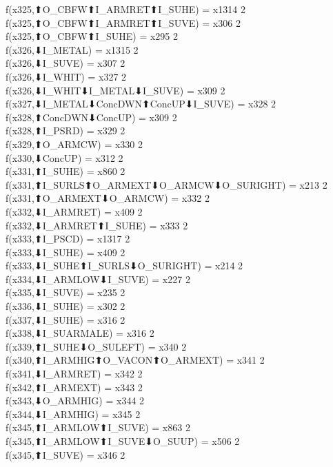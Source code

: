 f(x325,⬆O_CBFW⬆I_ARMRET⬆I_SUHE) = x1314 {2} \\
f(x325,⬆O_CBFW⬆I_ARMRET⬆I_SUVE) = x306 {2} \\
f(x325,⬆O_CBFW⬆I_SUHE) = x295 {2} \\
f(x326,⬇I_METAL) = x1315 {2} \\
f(x326,⬇I_SUVE) = x307 {2} \\
f(x326,⬇I_WHIT) = x327 {2} \\
f(x326,⬇I_WHIT⬇I_METAL⬇I_SUVE) = x309 {2} \\
f(x327,⬇I_METAL⬇ConcDWN⬆ConcUP⬇I_SUVE) = x328 {2} \\
f(x328,⬆ConcDWN⬇ConcUP) = x309 {2} \\
f(x328,⬆I_PSRD) = x329 {2} \\
f(x329,⬆O_ARMCW) = x330 {2} \\
f(x330,⬇ConcUP) = x312 {2} \\
f(x331,⬆I_SUHE) = x860 {2} \\
f(x331,⬆I_SURLS⬆O_ARMEXT⬇O_ARMCW⬇O_SURIGHT) = x213 {2} \\
f(x331,⬆O_ARMEXT⬇O_ARMCW) = x332 {2} \\
f(x332,⬇I_ARMRET) = x409 {2} \\
f(x332,⬇I_ARMRET⬆I_SUHE) = x333 {2} \\
f(x333,⬆I_PSCD) = x1317 {2} \\
f(x333,⬇I_SUHE) = x409 {2} \\
f(x333,⬇I_SUHE⬆I_SURLS⬇O_SURIGHT) = x214 {2} \\
f(x334,⬇I_ARMLOW⬇I_SUVE) = x227 {2} \\
f(x335,⬇I_SUVE) = x235 {2} \\
f(x336,⬇I_SUHE) = x302 {2} \\
f(x337,⬇I_SUHE) = x316 {2} \\
f(x338,⬇I_SUARMALE) = x316 {2} \\
f(x339,⬆I_SUHE⬇O_SULEFT) = x340 {2} \\
f(x340,⬆I_ARMHIG⬆O_VACON⬆O_ARMEXT) = x341 {2} \\
f(x341,⬇I_ARMRET) = x342 {2} \\
f(x342,⬆I_ARMEXT) = x343 {2} \\
f(x343,⬇O_ARMHIG) = x344 {2} \\
f(x344,⬇I_ARMHIG) = x345 {2} \\
f(x345,⬆I_ARMLOW⬆I_SUVE) = x863 {2} \\
f(x345,⬆I_ARMLOW⬆I_SUVE⬇O_SUUP) = x506 {2} \\
f(x345,⬆I_SUVE) = x346 {2} \\
